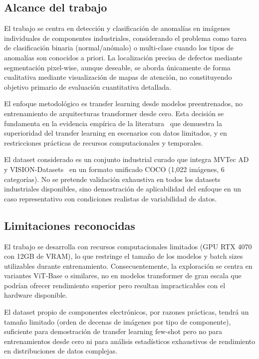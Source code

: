 \subsection{Alcance del trabajo}

El trabajo se centra en detección y clasificación de anomalías en imágenes individuales de componentes industriales, considerando el problema como tarea de clasificación binaria (normal/anómalo) o multi-clase cuando los tipos de anomalías son conocidos a priori. La localización precisa de defectos mediante segmentación pixel-wise, aunque deseable, se aborda únicamente de forma cualitativa mediante visualización de mapas de atención, no constituyendo objetivo primario de evaluación cuantitativa detallada.

El enfoque metodológico es transfer learning desde modelos preentrenados, no entrenamiento de arquitecturas transformer desde cero. Esta decisión se fundamenta en la evidencia empírica de la literatura~\cite{huang2025semiconductor,khan2024survey} que demuestra la superioridad del transfer learning en escenarios con datos limitados, y en restricciones prácticas de recursos computacionales y temporales.

El dataset considerado es un conjunto industrial curado que integra MVTec AD~\cite{bergmann2019mvtec} y VISION-Datasets~\cite{bai2023visiondatasets} en un formato unificado COCO (1{,}022 imágenes, 6 categorías). No se pretende validación exhaustiva en todos los datasets industriales disponibles, sino demostración de aplicabilidad del enfoque en un caso representativo con condiciones realistas de variabilidad de datos.

\subsection{Limitaciones reconocidas}

El trabajo se desarrolla con recursos computacionales limitados (\acrshort{GPU} RTX 4070 con 12GB de \acrshort{VRAM}), lo que restringe el tamaño de los modelos y batch sizes utilizables durante entrenamiento. Consecuentemente, la exploración se centra en variantes ViT-Base o similares, no en modelos transformer de gran escala que podrían ofrecer rendimiento superior pero resultan impracticables con el hardware disponible.

El dataset propio de componentes electrónicos, por razones prácticas, tendrá un tamaño limitado (orden de decenas de imágenes por tipo de componente), suficiente para demostración de transfer learning few-shot pero no para entrenamientos desde cero ni para análisis estadísticos exhaustivos de rendimiento en distribuciones de datos complejas.


